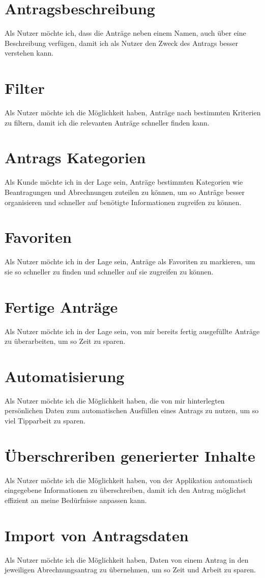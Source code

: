 \section{Antragsbeschreibung}
Als Nutzer möchte ich, dass die Anträge neben einem Namen, auch über eine Beschreibung verfügen, damit
ich als Nutzer den Zweck des Antrags besser verstehen kann.
\section{Filter}
Als Nutzer möchte ich die Möglichkeit haben, Anträge nach bestimmten Kriterien zu filtern, 
damit ich die relevanten Anträge schneller finden kann.
\section{Antrags Kategorien}
Als Kunde möchte ich in der Lage sein, Anträge bestimmten Kategorien wie Beantragungen und 
Abrechnungen zuteilen zu können, um so Anträge besser organisieren und schneller auf benötigte 
Informationen zugreifen zu können.
\section{Favoriten}
Als Nutzer möchte ich in der Lage sein, Anträge als Favoriten zu markieren, um sie so schneller zu 
finden und schneller auf sie zugreifen zu können.
\section{Fertige Anträge}
Als Nutzer möchte ich in der Lage sein, von mir bereits fertig ausgefüllte Anträge zu überarbeiten, um 
so Zeit zu sparen.
\section{Automatisierung}
Als Nutzer möchte ich die Möglichkeit haben, die von mir hinterlegten persönlichen Daten zum 
automatischen Ausfüllen eines Antrags zu nutzen, um so viel Tipparbeit zu sparen.
\section{Überschreriben generierter Inhalte}
Als Nutzer möchte ich die Möglichkeit haben, von der Applikation automatisch eingegebene Informationen 
zu überschreiben, damit ich den Antrag möglichst effizient an meine Bedürfnisse anpassen kann.
\section{Import von Antragsdaten}
Als Nutzer möchte ich die Möglichkeit haben, Daten von einem Antrag in den jeweiligen 
Abrechnungsantrag zu übernehmen, um so Zeit und Arbeit zu sparen.

